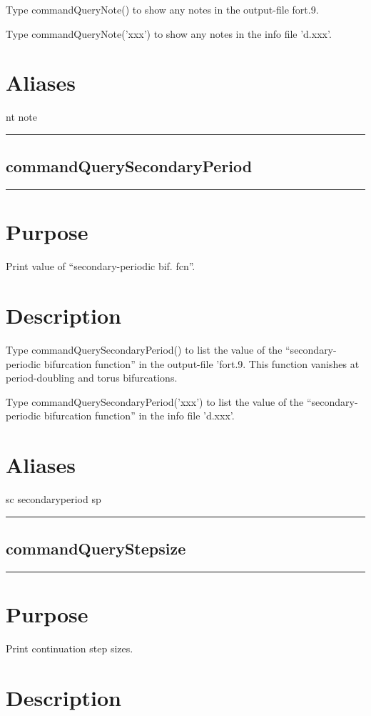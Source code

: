 \documentclass[12pt]{report}
\begin{document}
\begin{minipage}{6in}
    Type commandQueryNote() to show any notes 
    in the output-file fort.9.

    Type commandQueryNote('xxx') to show any notes 
    in the info file 'd.xxx'.
    \section*{Aliases}
nt note \medskip\hrule\end{minipage}\subsection{commandQuerySecondaryPeriod} \label{sec:clui_ref_commandQuerySecondaryPeriod}\begin{minipage}{6in}\hrule\medskip\section*{Purpose}
Print value of ``secondary-periodic bif. fcn''.\section*{Description}

    Type commandQuerySecondaryPeriod()  to list the value of the 
    ``secondary-periodic bifurcation function'' 
    in the output-file 'fort.9. This function
    vanishes at period-doubling and torus bifurcations.

    Type commandQuerySecondaryPeriod('xxx') to list the value of the
    ``secondary-periodic bifurcation function''
    in the info file 'd.xxx'.
    \section*{Aliases}
sc secondaryperiod sp \medskip\hrule\end{minipage}\subsection{commandQueryStepsize} \label{sec:clui_ref_commandQueryStepsize}\begin{minipage}{6in}\hrule\medskip\section*{Purpose}
Print continuation step sizes.\section*{Description}


\end{minipage}
\end{document}

